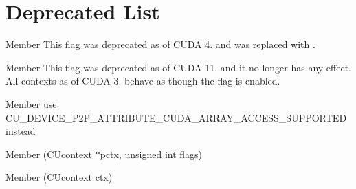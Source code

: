 \chapter{Deprecated List}
\hypertarget{deprecated}{}\label{deprecated}

\begin{DoxyRefList}
\item[Member \doxylink{group___c_u_d_a___t_y_p_e_s_gga12d89ce3fea2678bf187aa2876ed67a6ab5bf395cc60a8cbded4c329ae9430b91}{CU\+\_\+\+CTX\+\_\+\+BLOCKING\+\_\+\+SYNC} ]\label{deprecated__deprecated000045}%
%
This flag was deprecated as of CUDA 4. and was replaced with .  
\item[Member \doxylink{group___c_u_d_a___t_y_p_e_s_gga12d89ce3fea2678bf187aa2876ed67a6a08c822db270f4322af6e6bb0a7786514}{CU\+\_\+\+CTX\+\_\+\+MAP\+\_\+\+HOST} ]\label{deprecated__deprecated000046}%
%
This flag was deprecated as of CUDA 11. and it no longer has any effect. All contexts as of CUDA 3. behave as though the flag is enabled.  
\item[Member \doxylink{group___c_u_d_a___t_y_p_e_s_ggadc810c97323fb22063ba25328e81ba19a07a4ae30f555b208dcb2065320c9e2e1}{CU\+\_\+\+DEVICE\+\_\+\+P2\+P\+\_\+\+ATTRIBUTE\+\_\+\+ACCESS\+\_\+\+ACCESS\+\_\+\+SUPPORTED} ]\label{deprecated__deprecated000051}%
%
use CU\+\_\+\+DEVICE\+\_\+\+P2\+P\+\_\+\+ATTRIBUTE\+\_\+\+CUDA\+\_\+\+ARRAY\+\_\+\+ACCESS\+\_\+\+SUPPORTED instead  
\item[Member \doxylink{group___c_u_d_a___c_t_x___d_e_p_r_e_c_a_t_e_d_gae118a2c1b115197b58f419aab738fecb}{cu\+Ctx\+Attach} (CUcontext \texorpdfstring{$\ast$}{*}pctx, unsigned int flags)]\label{deprecated__deprecated000003}%
%
 
\item[Member \doxylink{group___c_u_d_a___c_t_x___d_e_p_r_e_c_a_t_e_d_gafe50007d47a1a5d274365d172e9bd4c6}{cu\+Ctx\+Detach} (CUcontext ctx)]\label{deprecated__deprecated000004}%
%
 

\end{DoxyRefList}
